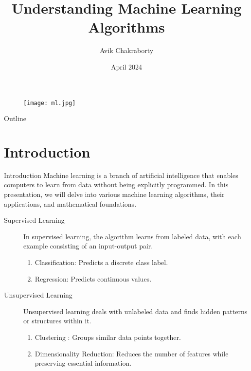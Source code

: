 \documentclass{beamer}
\begin{document}
	
	\title{Understanding Machine Learning Algorithms}
	\author{Avik Chakraborty}
	\date{April 2024}
	
	
	\begin{frame}
		\begin{figure}[H]
			\centering
			\texttt{[image: ml.jpg]}
		\end{figure}
		\titlepage
		
	\end{frame}
	
	\begin{frame}{Outline}
		\tableofcontents
	\end{frame}
	
	\section{Introduction}
	\begin{frame}{Introduction}
		Machine learning is a branch of artificial intelligence that enables computers to learn from data without being explicitly programmed. In this presentation, we will delve into various machine learning algorithms, their applications, and mathematical foundations.
		
		\begin{description}
			\item[Supervised Learning]
			In supervised learning, the algorithm learns from labeled data, with each example consisting of an input-output pair.
			\begin{enumerate}
				\item Classification: Predicts a discrete class label.
				\item Regression: Predicts continuous values.
			\end{enumerate}
			\item[Unsupervised Learning] 
			Unsupervised learning deals with unlabeled data and finds hidden patterns or structures within it.
			\begin{enumerate}
				\item Clustering : Groups similar data points together.
				\item Dimensionality Reduction: Reduces the number of features while preserving essential information.
			\end{enumerate}
		\end{description}
	\end{frame}
	
\end{document}
